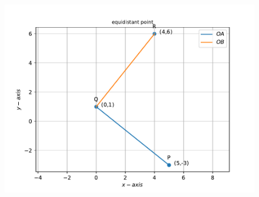 \documentclass[12pt]{article}
\begin{document}
\begin{enumerate}
\begin{figure}[!h]
 \begin{center}
  \includegraphics[width=\columnwidth]{./figs/fig.pdf}
 \end{center}
\caption{}
\label{fig:Fig1}
\end{figure}

\end{enumerate}
\end{document}
